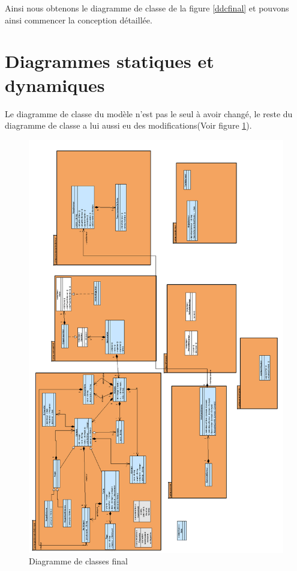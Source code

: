 Ainsi nous obtenons le diagramme de classe de la figure \ref{ddcfinal} et pouvons ainsi commencer la conception détaillée.

\section{Diagrammes statiques et dynamiques}

Le diagramme de classe du modèle n'est pas le seul à avoir changé, le reste du diagramme de classe a lui aussi eu des modifications(Voir figure \ref{ddctotal}).

\begin{figure}[!ht]
\begin{center}
\includegraphics[width=14cm]{images/FullClassDiagram.png}
\caption{Diagramme de classes final}
\label{ddctotal}
\end{center}
\end{figure}

